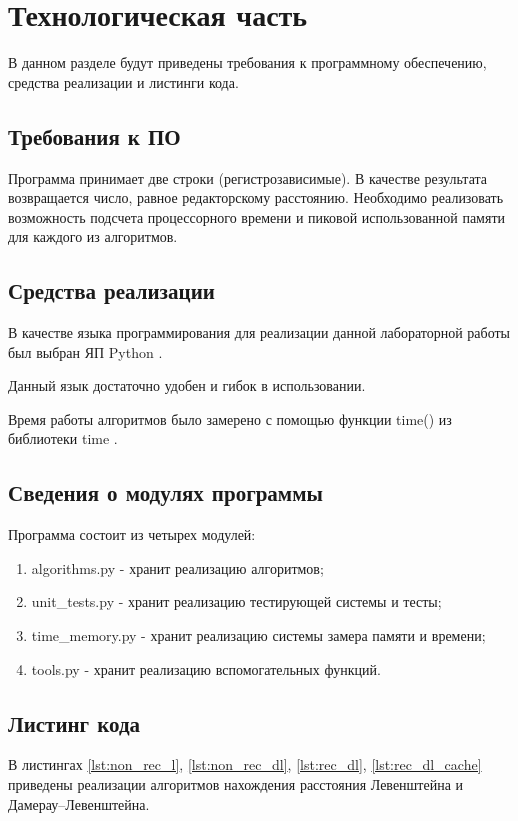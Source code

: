 \chapter{Технологическая часть}

В данном разделе будут приведены требования к программному обеспечению, средства реализации и листинги кода.

\section{Требования к ПО}

Программа принимает две строки (регистрозависимые). В качестве результата возвращается число, равное редакторскому расстоянию. Необходимо реализовать возможность подсчета процессорного времени и пиковой использованной памяти для каждого из алго­ритмов.

\section{Средства реализации}

В качестве языка программирования для реализации данной лабораторной работы был выбран ЯП Python \cite{pythonlang}. 

Данный язык достаточно удобен и гибок в использовании. 

Время работы алгоритмов было замерено с помощью функции time() из библиотеки time \cite{pythonlangtime}.

\section{Сведения о модулях программы}
Программа состоит из четырех модулей:
\begin{enumerate}
	\item algorithms.py - хранит реализацию алгоритмов;
	\item unit\_tests.py - хранит реализацию тестирующей системы и тесты;
	\item time\_memory.py - хранит реализацию системы замера памяти и времени;
	\item tools.py - хранит реализацию вспомогательных функций.
\end{enumerate}


\section{Листинг кода}

 В листингах \ref{lst:non_rec_l}, \ref{lst:non_rec_dl}, \ref{lst:rec_dl}, \ref{lst:rec_dl_cache} приведены реализации алгоритмов нахождения расстояния Левенштейна и Дамерау--Левенштейна.

